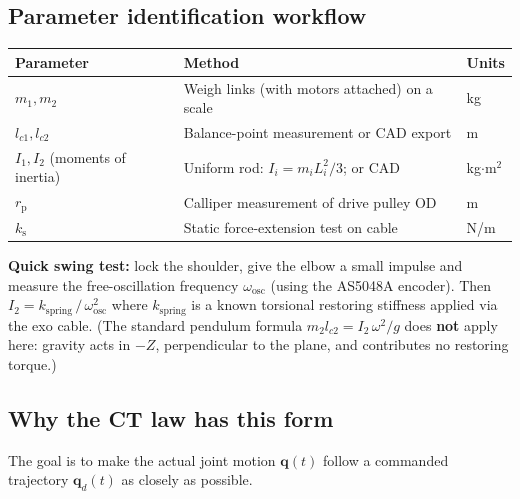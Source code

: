 \documentclass[11pt,a4paper]{article}
\newcommand{\vq}{\bm{q}}
\newcommand{\rp}{r_{\mathrm{p}}}
\newcommand{\ks}{k_{\mathrm{s}}}
\begin{document}
\subsection{Parameter identification workflow}

\begin{center}\small
\begin{tabular}{lll}
\toprule
\textbf{Parameter} & \textbf{Method} & \textbf{Units} \\
\midrule
$m_1, m_2$       & Weigh links (with motors attached) on a scale & kg \\
$l_{c1}, l_{c2}$ & Balance-point measurement or CAD export & m \\
$I_1, I_2$ (moments of inertia) & Uniform rod: $I_i{=}m_i L_i^2/3$; or CAD & kg$\cdot$m$^2$ \\
$\rp$            & Calliper measurement of drive pulley OD & m \\
$\ks$            & Static force-extension test on cable & N/m \\
\bottomrule
\end{tabular}
\end{center}

\textbf{Quick swing test:} lock the shoulder, give the elbow a small impulse
and measure the free-oscillation frequency $\omega_{\mathrm{osc}}$ (using the
AS5048A encoder).  Then $I_2 = k_{\mathrm{spring}}\,/\,\omega_{\mathrm{osc}}^2$
where $k_{\mathrm{spring}}$ is a known torsional restoring stiffness applied
via the exo cable.  (The standard pendulum formula $m_2 l_{c2} = I_2\,\omega^2/g$
does \textbf{not} apply here: gravity acts in $-Z$, perpendicular to the plane,
and contributes no restoring torque.)

\subsection{Why the CT law has this form}

The goal is to make the actual joint motion $\vq(t)$ follow a commanded
trajectory $\vq_d(t)$ as closely as possible.
\end{document}

